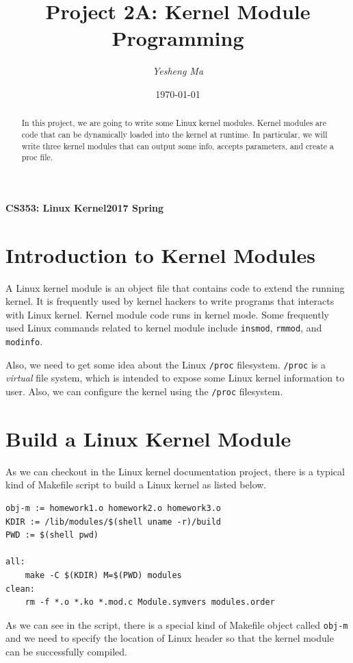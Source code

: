 \documentclass{article}
\begin{document}
\title{Project 2A: Kernel Module Programming}
\author{\textit{Yesheng Ma}}
\date{\today}
{\bf\small CS353: Linux Kernel}\hfill{\bf\small 2017 Spring}
{\let\newpage\relax\maketitle}
\maketitle


\begin{abstract} 
In this project, we are going to write some Linux kernel modules. Kernel modules are code that can be dynamically loaded into the kernel at runtime. In particular, we will write three kernel modules that can output some info, accepts parameters, and create a proc file.
\end{abstract}


\section{Introduction to Kernel Modules}
A Linux kernel module is an object file that contains code to extend the running kernel. It is frequently used by kernel hackers to write programs that interacts with Linux kernel. Kernel module code runs in kernel mode. Some frequently used Linux commands related to kernel module include \verb|insmod|, \verb|rmmod|, and \verb|modinfo|.

Also, we need to get some idea about the Linux \verb|/proc| filesystem. \verb|/proc| is a \emph{virtual} file system, which is intended to expose some Linux kernel information to user. Also, we can configure the kernel using the \verb|/proc| filesystem.


\section{Build a Linux Kernel Module}
As we can checkout in the Linux kernel documentation project, there is a typical kind of Makefile script to build a Linux kernel as listed below.
\begin{lstlisting}
obj-m := homework1.o homework2.o homework3.o
KDIR := /lib/modules/$(shell uname -r)/build
PWD := $(shell pwd)

all:
	make -C $(KDIR) M=$(PWD) modules
clean:
	rm -f *.o *.ko *.mod.c Module.symvers modules.order
\end{lstlisting}
As we can see in the script, there is a special kind of Makefile object called \texttt{obj-m} and we need to specify the location of Linux header so that the kernel module can be successfully compiled.
\end{document}
